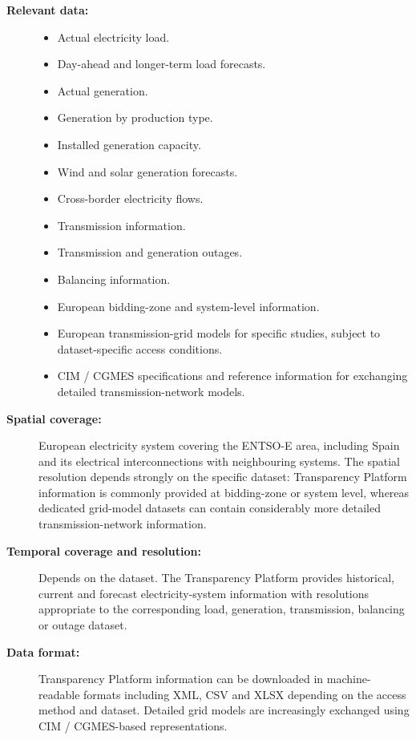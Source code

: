 \begin{description}
    \item[\textbf{Relevant data:}] \hfill
    \begin{itemize}
        \item Actual electricity load.
        \item Day-ahead and longer-term load forecasts.
        \item Actual generation.
        \item Generation by production type.
        \item Installed generation capacity.
        \item Wind and solar generation forecasts.
        \item Cross-border electricity flows.
        \item Transmission information.
        \item Transmission and generation outages.
        \item Balancing information.
        \item European bidding-zone and system-level information.
        \item European transmission-grid models for specific studies,
        subject to dataset-specific access conditions.
        \item CIM / CGMES specifications and reference information for
        exchanging detailed transmission-network models.
    \end{itemize}

    \item[\textbf{Spatial coverage:}]
    European electricity system covering the ENTSO-E area, including
    Spain and its electrical interconnections with neighbouring systems.
    The spatial resolution depends strongly on the specific dataset:
    Transparency Platform information is commonly provided at bidding-zone
    or system level, whereas dedicated grid-model datasets can contain
    considerably more detailed transmission-network information.

    \item[\textbf{Temporal coverage and resolution:}]
    Depends on the dataset. The Transparency Platform provides historical,
    current and forecast electricity-system information with resolutions
    appropriate to the corresponding load, generation, transmission,
    balancing or outage dataset.

    \item[\textbf{Data format:}]
    Transparency Platform information can be downloaded in machine-readable
    formats including XML, CSV and XLSX depending on the access method and
    dataset. Detailed grid models are increasingly exchanged using CIM /
    CGMES-based representations.


\end{description}

